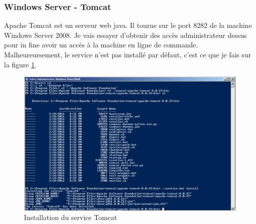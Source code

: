 \documentclass[a4paper]{article}
\begin{document}
\newpage \subsubsection{Windows Server - Tomcat}






Apache Tomcat est un serveur web java. Il tourne sur le port 8282 de la machine Windows Server 2008. Je vais essayer d'obtenir des accès administrateur dessus pour in fine avoir un accès à la machine en ligne de commande. Malheureursement, le service n'est pas installé par défaut, c'est ce que je fais sur la figure \ref{fig:installTomcat}.

\begin{figure}[H]
    \centering
    \includegraphics[width=0.90\linewidth]{images/install-tomcat-service.PNG}
    \caption{Installation du service Tomcat}
    \label{fig:installTomcat}
\end{figure}
\end{document}
